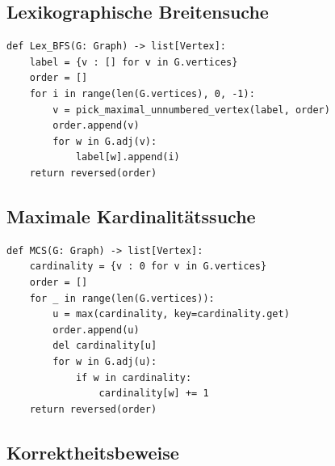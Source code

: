 \documentclass[../main.tex]{subfiles}
\begin{document}
\subsection{Lexikographische Breitensuche}


\begin{listing}[ht]
\label{algo:LexBFS}
\caption{Lexikographische Breitensuche baut für einen triangulierten Graphen ein Perfektes Knoten-Eliminationsschema}
\begin{verbatim}
def Lex_BFS(G: Graph) -> list[Vertex]:
    label = {v : [] for v in G.vertices}
    order = []
    for i in range(len(G.vertices), 0, -1):
        v = pick_maximal_unnumbered_vertex(label, order)
        order.append(v)
        for w in G.adj(v):
            label[w].append(i)
    return reversed(order)
\end{verbatim}
\end{listing}


\subsection{Maximale Kardinalitätssuche}

\begin{listing}[ht]
\label{algo:MCS}
\caption{Maximale Kardinalitätssuche baut ebenfalls für einen triangulierten Graphen ein Perfektes Knoten-Eliminationsschema}
\begin{verbatim}
def MCS(G: Graph) -> list[Vertex]:
    cardinality = {v : 0 for v in G.vertices}
    order = []
    for _ in range(len(G.vertices)):
        u = max(cardinality, key=cardinality.get)
        order.append(u)
        del cardinality[u]
        for w in G.adj(u):
            if w in cardinality:
                cardinality[w] += 1
    return reversed(order)
\end{verbatim}
\end{listing}


\subsection{Korrektheitsbeweise}
\end{document}
